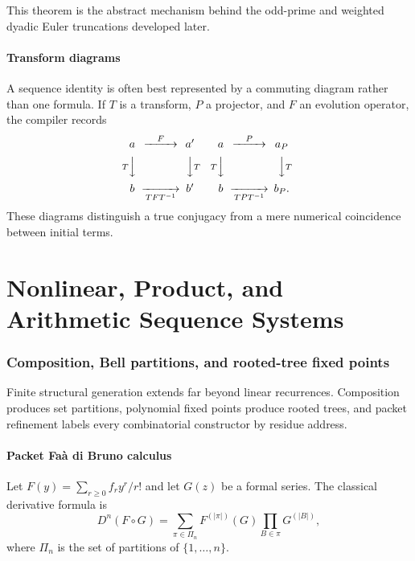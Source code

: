\documentclass[11pt]{article}
\theoremstyle{definition}\newtheorem{definition}[theorem]{Definition}\newtheorem{example}[theorem]{Example}\newtheorem{construction}[theorem]{Construction}\newtheorem{algorithm}[theorem]{Algorithm}\newtheorem{conjecture}[theorem]{Conjecture}\newtheorem{problem}[theorem]{Problem}
\theoremstyle{remark}\newtheorem{remark}[theorem]{Remark}\newtheorem{boundary}[theorem]{Boundary}\newtheorem{certificate}[theorem]{Computational Certificate}\newtheorem{classical}[theorem]{Classical Input}\newtheorem{principle}[theorem]{Structural Principle}
\begin{document}
This theorem is the abstract mechanism behind the odd-prime and weighted dyadic Euler truncations developed later.

\subsection{Transform diagrams}
A sequence identity is often best represented by a commuting diagram rather than one formula.  If $T$ is a transform, $P$ a projector, and $F$ an evolution operator, the compiler records
\[
 \begin{CD}
 a @>F>> a'\\
 @VT VV @VV T V\\
 b @>>TFT^{-1}> b'
 \end{CD}
 \qquad
 \begin{CD}
 a @>P>> a_P\\
 @VT VV @VV T V\\
 b @>>TPT^{-1}> b_P.
 \end{CD}
\]
These diagrams distinguish a true conjugacy from a mere numerical coincidence between initial terms.



\part{Nonlinear, Product, and Arithmetic Sequence Systems}
\section{Composition, Bell partitions, and rooted-tree fixed points}\label{sec:nonlinear}

Finite structural generation extends far beyond linear recurrences.  Composition produces set partitions, polynomial fixed points produce rooted trees, and packet refinement labels every combinatorial constructor by residue address.

\subsection{Packet Fa\`a di Bruno calculus}
Let $F(y)=\sum_{r\geq0}f_r y^r/r!$ and let $G(z)$ be a formal series.  The classical derivative formula is
\[
 D^n(F\circ G)
 =
 \sum_{\pi\in\Pi_n}
 F^{(|\pi|)}(G)
 \prod_{B\in\pi}G^{(|B|)},
\]
where $\Pi_n$ is the set of partitions of $\{1,\ldots,n\}$.
\end{document}
